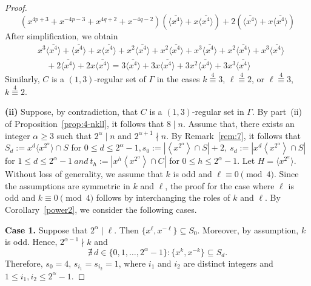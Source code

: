\documentclass[12pt]{article}
\begin{document}
\begin{proof}
\[
\left(x^{4p+3}+x^{-4p-3}+x^{4q+2}+x^{-4q-2}\right)
\left(\overline{\langle x^{4}\rangle}+x\overline{\langle x^{4}\rangle}\right)
+2\left(\overline{\langle x^{4}\rangle}+x\overline{\langle x^{4}\rangle}\right)
\]
After simplification, we obtain
\[
\begin{aligned}
	&x^3\overline{\langle x^{4}\rangle}
	+\overline{\langle x^{4}\rangle}
	+x\overline{\langle x^{4}\rangle}
	+x^{2}\overline{\langle x^{4}\rangle}
	+x^{2}\overline{\langle x^{4}\rangle}+x^{3}\overline{\langle x^{4}\rangle}+x^{2}\overline{\langle x^{4}\rangle}
	+x^{3}\overline{\langle x^{4}\rangle} \\
	&\quad
	+2\overline{\langle x^{4}\rangle}
	+2x\overline{\langle x^{4}\rangle}
	=3\overline{\langle x^{4}\rangle}
	+3x\overline{\langle x^{4}\rangle}
	+3x^{2}\overline{\langle x^{4}\rangle}
	+3x^{3}\overline{\langle x^{4}\rangle}
\end{aligned}
\]
Similarly, $C$ is a $(1,3)$-regular set of $\Gamma$ in
the cases $k\stackrel{4}{\equiv}3$, $\ell\stackrel{4}{\equiv}2$, or $\ell\stackrel{4}{\equiv}3$, $k\stackrel{4}{\equiv}2$.

\textbf{(ii)}
Suppose, by contradiction, that \(C\) is a \((1,3)\)-regular set in \(\Gamma\). By part~(ii) of Proposition~\ref{prop:4-nkll}, it follows that \(8\mid n\). Assume that, there exists an integer \(\alpha\ge 3\) such that
$
2^{\alpha}\mid n$
and
$2^{\alpha+1}\nmid n.$ By Remark~\ref{rem:7}, it follows that $ S_d := x^d \langle x^{2^{\alpha}} \rangle \cap S$ for $0 \le d \le 2^{\alpha}-1, s_0:=\left|\left\langle x^{2^{\alpha}}\right\rangle\cap S\right|+2,\ 	s_d:=\left|x^d\left\langle x^{2^{\alpha}}\right\rangle\cap S\right|$ for $1\le d\le 2^{\alpha}-1\ and\ t_h:=\left|x^h\left\langle x^{2^{\alpha}}\right\rangle\cap C\right|$ for $0\le h\le 2^{\alpha}-1.$ Let
$
H=\langle x^{2^{\alpha}}\rangle.
$ Without loss of generality, we assume that \(k\) is odd and
\(\ell\equiv0\pmod4\). Since the assumptions are symmetric in
\(k\) and \(\ell\), the proof for the case where \(\ell\) is odd
and \(k\equiv0\pmod4\) follows by interchanging the roles of
\(k\) and \(\ell\).
By Corollary~\ref{power2}, we consider the following cases.

\textbf{Case 1.}   Suppose that \(2^{\alpha}\mid \ell\). Then
$
\{x^{\ell},x^{-\ell}\}\subseteq S_0.
$
Moreover, by assumption, \(k\) is odd. Hence,
$
2^{\alpha-1}\nmid k
$
and
\[
\nexists\, d\in\{0,1,\ldots,2^{\alpha}-1\} :
\{x^{k},x^{-k}\}\subseteq S_d.
\]
Therefore, \(s_0=4\), \(s_{i_1}=s_{i_2}=1\), where \(i_1\) and \(i_2\) are distinct integers and \(1\le i_1,i_2\le 2^{\alpha}-1\).
 	

\end{proof}
\end{document}
